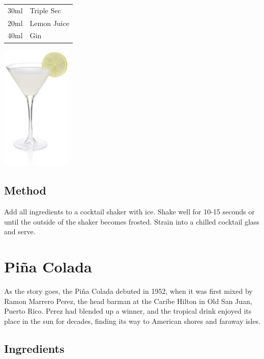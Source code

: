 \documentclass[12pt, letterpaper]{article}
\begin{document}
\begin{multicols}{2}

\begin{tabular} { r | l}
    30ml & Triple Sec \\
    20ml & Lemon Juice \\
    40ml & Gin
\end{tabular}

\includegraphics[height=6cm]{whitelady}

\end{multicols}

\subsection*{Method}
Add all ingredients to a cocktail shaker with ice.
Shake well for 10-15 seconds or until the outside of the shaker becomes frosted.
Strain into a chilled cocktail glass and serve.

\pagebreak
\section{Piña Colada}
As the story goes, the Piña Colada debuted in 1952, when it was first mixed by Ramon Marrero Perez,
the head barman at the Caribe Hilton in Old San Juan, Puerto Rico. Perez had blended up a winner,
and the tropical drink enjoyed its place in the sun for decades,
finding its way to American shores and faraway isles.

\subsection*{Ingredients}
\end{document}
